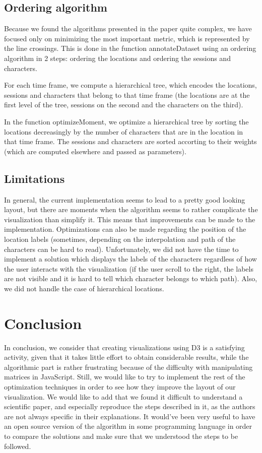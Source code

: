 \documentclass{report}
\begin{document}
\section{Ordering algorithm}
\par
Because we found the algorithms presented in the paper quite complex, we have focused only on minimizing the most important metric, which is represented by the line crossings. This is done in the function annotateDataset using an ordering algorithm in 2 steps: ordering the locations and ordering the sessions and characters.
\par For each time frame, we compute a hierarchical tree, which encodes the locations, sessions and characters that belong to that time frame (the locations are at the first level of the tree, sessions on the second and the characters on the third).
\par
In the function optimizeMoment, we optimize a hierarchical tree by sorting the locations decreasingly by the number of characters that are in the location in that time frame. The sessions and characters are sorted accorting to their weights (which are computed elsewhere and passed as parameters).
\par
\section{Limitations}
In general, the current implementation seems to lead to a pretty good looking layout, but there are moments when the algorithm seems to rather complicate the visualization than simplify it. This means that improvements can be made to the implementation.
Optimizations can also be made regarding the position of the location labels (sometimes, depending on the interpolation and path of the characters can be hard to read). Unfortunately, we did not have the time to implement a solution which displays the labels of the characters regardless of how the user interacts with the visualization (if the user scroll to the right, the labels are not visible and it is hard to tell which character belongs to which path).
Also, we did not handle the case of hierarchical locations.

\chapter{Conclusion}
\par
In conclusion, we consider that creating visualizations using D3 is a satisfying activity, given that it takes little effort to obtain considerable results, while the algorithmic part is rather frustrating because of the difficulty with manipulating matrices in JavaScript. Still, we would like to try to implement the rest of the optimization techniques in order to see how they improve the layout of our visualization. We would like to add that we found it difficult to understand a scientific paper, and especially reproduce the steps described in it, as the authors are not always specific in their explanations. It would've been very useful to have an open source version of the algorithm in some programming language in order to compare the solutions and make sure that we understood the steps to be followed.

  

\end{document}
